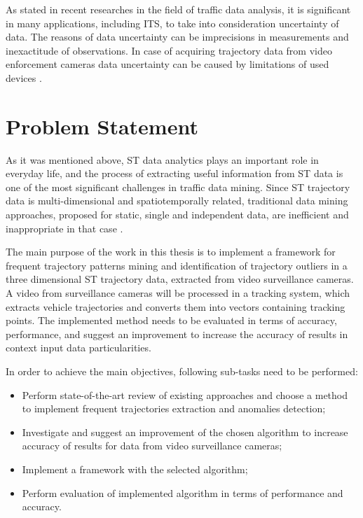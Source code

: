 As stated in recent researches in the field of traffic data analysis, it is significant in many applications, including ITS, to take into consideration uncertainty of data. The reasons of data uncertainty can be imprecisions in measurements and inexactitude of observations. In case of acquiring trajectory data from video enforcement cameras data uncertainty can be caused by limitations of used devices \cite{inproceedings:14_mpfstsp_gp_ud}.

\section{Problem Statement}

As it was mentioned above, ST data analytics plays an important role in everyday life, and the process of extracting useful information from ST data is one of the most significant challenges in traffic data mining. Since ST trajectory data is multi-dimensional and spatiotemporally related, traditional data mining approaches, proposed for static, single and independent data, are inefficient and inappropriate in that case \cite{article:8_review_mot_cl_alg}.

The main purpose of the work in this thesis is to implement a framework for frequent trajectory patterns mining and identification of trajectory outliers in a three dimensional ST trajectory data, extracted from video surveillance cameras. A video from surveillance cameras will be processed in a tracking system, which extracts vehicle trajectories and converts them into vectors containing tracking points. The implemented method needs to be evaluated in terms of accuracy, performance, and suggest an improvement to increase the accuracy of results in context input data particularities. 

In order to achieve the main objectives, following sub-tasks need to be performed:
\begin{itemize}
	\item Perform state-of-the-art review of existing approaches and choose a method to implement frequent trajectories extraction and anomalies detection;
	\item Investigate and suggest an improvement of the chosen algorithm to increase accuracy of results for data from video surveillance cameras;
	\item Implement a framework with the selected algorithm;
	\item Perform evaluation of implemented algorithm in terms of performance and accuracy.
\end{itemize}

